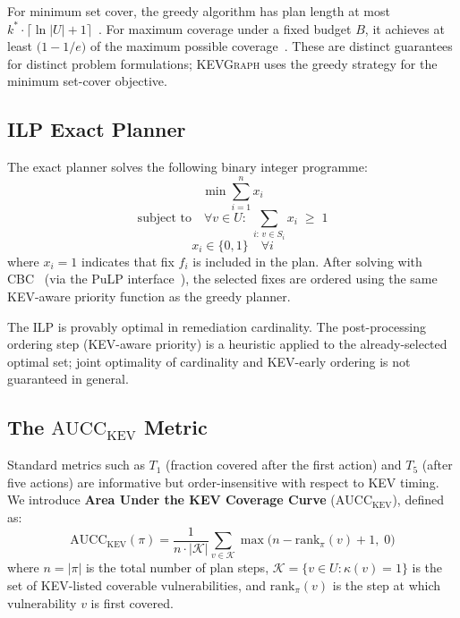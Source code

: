 \documentclass[conference]{IEEEtran}
\newcommand{\kevgraph}{\textsc{KEVGraph}\xspace}
\newcommand{\aucc}{$\mathrm{AUCC}_{\mathrm{KEV}}$\xspace}
\begin{document}
For minimum set cover, the greedy algorithm has plan length at most
$k^* \cdot \lceil \ln|U| + 1\rceil$~\cite{johnson74}.
For maximum coverage under a fixed budget $B$, it achieves
at least $\bigl(1 - 1/e\bigr)$ of the maximum possible
coverage~\cite{nemhauser78}.  These are distinct guarantees for
distinct problem formulations; \kevgraph uses the greedy strategy
for the minimum set-cover objective.

\subsection{ILP Exact Planner}

The exact planner solves the following binary integer programme:
\begin{equation}
  \min \sum_{i=1}^{n} x_i
\end{equation}
\begin{equation}
  \text{subject to} \quad
    \forall v \in U:\; \sum_{i:\, v \in S_i} x_i \;\geq\; 1
\end{equation}
\begin{equation}
  x_i \in \{0, 1\} \quad \forall i
\end{equation}
where $x_i = 1$ indicates that fix $f_i$ is included in the plan.
After solving with CBC~\cite{cbc} (via the PuLP interface~\cite{pulp}),
the selected fixes are ordered using the same KEV-aware priority
function as the greedy planner.

The ILP is provably optimal in remediation cardinality.  The
post-processing ordering step (KEV-aware priority) is a heuristic
applied to the already-selected optimal set; joint optimality of
cardinality and KEV-early ordering is not guaranteed in general.

\subsection{The \aucc Metric}
\label{sec:aucc}

Standard metrics such as $T_1$ (fraction covered after the first
action) and $T_5$ (after five actions) are informative but
order-insensitive with respect to KEV timing.  We introduce
\textbf{Area Under the KEV Coverage Curve} (\aucc), defined as:
\[
  \mathrm{AUCC}_{\mathrm{KEV}}(\pi) =
    \frac{1}{n \cdot |\mathcal{K}|}
    \sum_{v \in \mathcal{K}} \max\bigl(n - \mathrm{rank}_\pi(v) + 1,\; 0\bigr)
\]
where $n = |\pi|$ is the total number of plan steps,
$\mathcal{K} = \{v \in U : \kappa(v) = 1\}$ is the set of
KEV-listed coverable vulnerabilities, and $\mathrm{rank}_\pi(v)$
is the step at which vulnerability $v$ is first covered.
\end{document}
